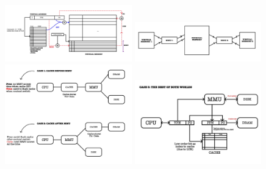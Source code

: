 \documentclass[8pt,landscape]{extarticle}
\begin{document}
\begin{multicols*}{5}
\includegraphics[width = 5.5cm]{TLB}
\includegraphics[width = 5.5cm]{Context}
\includegraphics[width = 5.5cm]{VMCache}
\includegraphics[width = 5.5cm]{VMBest}
\end{multicols*}
\end{document}
